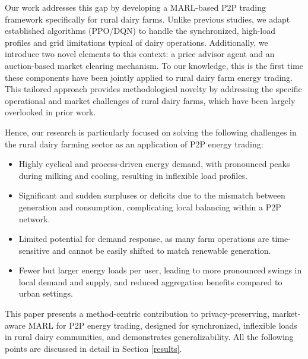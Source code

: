 \documentclass[preprint,12pt]{elsarticle}
\begin{document}
Our work addresses this gap by developing a MARL-based P2P trading framework specifically for rural dairy farms. Unlike previous studies, we adapt established algorithms (PPO/DQN) to handle the synchronized, high-load profiles and grid limitations typical of dairy operations. Additionally, we introduce two novel elements to this context: a price advisor agent and an auction-based market clearing mechanism. To our knowledge, this is the first time these components have been jointly applied to rural dairy farm energy trading. This tailored approach provides methodological novelty by addressing the specific operational and market challenges of rural dairy farms, which have been largely overlooked in prior work.



Hence, our research is particularly focused on solving the following challenges in the rural dairy farming sector as an application of P2P energy trading:



\begin{itemize}
    \item Highly cyclical and process-driven energy demand, with pronounced peaks during milking and cooling, resulting in inflexible load profiles.
    \item Significant and sudden surpluses or deficits due to the mismatch between generation and consumption, complicating local balancing within a P2P network.
    \item Limited potential for demand response, as many farm operations are time-sensitive and cannot be easily shifted to match renewable generation.
    \item Fewer but larger energy loads per user, leading to more pronounced swings in local demand and supply, and reduced aggregation benefits compared to urban settings.
\end{itemize}










This paper presents a method-centric contribution to privacy-preserving, market-aware MARL for P2P energy trading, designed for synchronized, inflexible loads in rural dairy communities, and demonstrates generalizability. All the following points are discussed in detail in Section \ref{results}.
\end{document}
